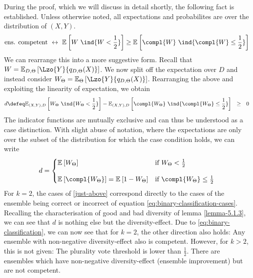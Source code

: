 \documentclass[../main.tex]{subfiles}
\begin{document}
During the proof, which we will discuss in detail shortly, the following fact is established. Unless otherwise noted, all expectations and probabilites are over the distribution of $(X,Y)$.
$$
\text{ens. competent} ~\leftrightarrow~ \mathbb{E}_{}\left[ W~\ind{W < \frac{1}{2}} \right] \geq \mathbb{E}_{}\left[ 
\compl{W}~\ind{\compl{W} \leq \frac{1}{2} } 
\right] 
$$
We can rearrange this into a more suggestive form. Recall that $W = \mathbb{E}_{D, \Theta}\left[ \Lzo{Y}{q_{D,\Theta}(X)} \right]$. We now split off the expectation over $D$ and instead consider $W_{\Theta} = \mathbb{E}_{\Theta}\left[ \Lzo{Y}{q_{D, \Theta}(X)} \right]$. Rearranging the above and exploiting the linearity of expectation, we obtain
$$
d \defeq \mathbb{E}_{(X,Y),D }\left[ W_{\Theta} ~\ind{W_{\Theta} < \frac{1}{2}} \right]  - \mathbb{E}_{(X,Y) ,D}\left[ \compl{W_{\Theta}} ~\ind{\compl{W_{\Theta}} \leq \frac{1}{2} } \right] ~ ~ \geq ~ ~  0
$$
The indicator functions are mutually exclusive and can thus be understood as a case distinction. With slight abuse of notation, where the expectations are only over the subset of the distribution for which the case condition holds, we can write
$$
d = 
\begin{cases}
\mathbb{E}_{}\left[ W_{\Theta} \right] & \text{if~} W_{\Theta} < \frac{1}{2} \\[1em]
\mathbb{E}_{}\left[ \compl{W_{\Theta}}  \right]  = \mathbb{E}_{}\left[ 1 - W_{\Theta} \right]  & \text{if~} \compl{W_{\Theta}} \leq \frac{1}{2} 
\end{cases}
$$
For $k=2$, the cases of \ref{just-above} correspond directly to the cases of the ensemble being correct or incorrect of equation \ref{eq:binary-classification-cases}. Recalling the characterisation of good and bad diversity of lemma \ref{lemma-5.1.3}, we can see that $d$ is nothing else but the diversity-effect. 
Due to \ref{eq:binary-classification}, we can now see that for $k=2$, the other direction also holds: Any ensemble with non-negative diversity-effect also is competent. However, for $k>2$, this is not given: The plurality vote threshold is lower than $\frac{1}{2}$. There are ensembles which have non-negative diversity-effect (ensemble improvement) but are not competent. %
\end{document}
